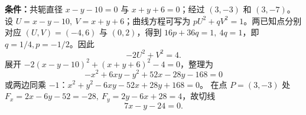 \textbf{条件：}共轭直径 $x-y-10=0$ 与 $x+y+6=0$；经过 $(3,-3)$ 和 $(3,-7)$。
设 $U=x-y-10,\ V=x+y+6$；曲线方程可写为 $pU^2+qV^2=1$。两已知点分别对应 $(U,V)=(-4,6)$ 与 $(0,2)$，得到 $16p+36q=1,\ 4q=1$，即 $q=1/4,p=-1/2$。因此
\[-2U^2+V^2=4.
\]
展开 $-2(x-y-10)^2+(x+y+6)^2-4=0$，整理为
\[\boxed{-x^2+6xy-y^2+52x-28y-168=0}\]
或两边同乘 $-1$：$\boxed{x^2+y^2-6xy-52x+28y+168=0}$。
在点 $P=(3,-3)$ 处 $F_x=2x-6y-52=-28,\ F_y=2y-6x+28=4$，故切线
\[\boxed{7x-y-24=0}.\]
